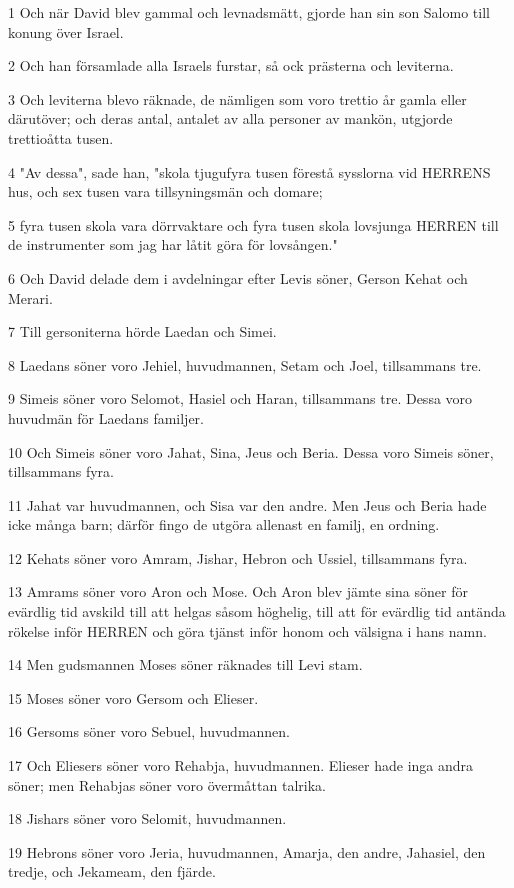\par 1 Och när David blev gammal och levnadsmätt, gjorde han sin son Salomo till konung över Israel.
\par 2 Och han församlade alla Israels furstar, så ock prästerna och leviterna.
\par 3 Och leviterna blevo räknade, de nämligen som voro trettio år gamla eller därutöver; och deras antal, antalet av alla personer av mankön, utgjorde trettioåtta tusen.
\par 4 "Av dessa", sade han, "skola tjugufyra tusen förestå sysslorna vid HERRENS hus, och sex tusen vara tillsyningsmän och domare;
\par 5 fyra tusen skola vara dörrvaktare och fyra tusen skola lovsjunga HERREN till de instrumenter som jag har låtit göra för lovsången."
\par 6 Och David delade dem i avdelningar efter Levis söner, Gerson Kehat och Merari.
\par 7 Till gersoniterna hörde Laedan och Simei.
\par 8 Laedans söner voro Jehiel, huvudmannen, Setam och Joel, tillsammans tre.
\par 9 Simeis söner voro Selomot, Hasiel och Haran, tillsammans tre. Dessa voro huvudmän för Laedans familjer.
\par 10 Och Simeis söner voro Jahat, Sina, Jeus och Beria. Dessa voro Simeis söner, tillsammans fyra.
\par 11 Jahat var huvudmannen, och Sisa var den andre. Men Jeus och Beria hade icke många barn; därför fingo de utgöra allenast en familj, en ordning.
\par 12 Kehats söner voro Amram, Jishar, Hebron och Ussiel, tillsammans fyra.
\par 13 Amrams söner voro Aron och Mose. Och Aron blev jämte sina söner för evärdlig tid avskild till att helgas såsom höghelig, till att för evärdlig tid antända rökelse inför HERREN och göra tjänst inför honom och välsigna i hans namn.
\par 14 Men gudsmannen Moses söner räknades till Levi stam.
\par 15 Moses söner voro Gersom och Elieser.
\par 16 Gersoms söner voro Sebuel, huvudmannen.
\par 17 Och Eliesers söner voro Rehabja, huvudmannen. Elieser hade inga andra söner; men Rehabjas söner voro övermåttan talrika.
\par 18 Jishars söner voro Selomit, huvudmannen.
\par 19 Hebrons söner voro Jeria, huvudmannen, Amarja, den andre, Jahasiel, den tredje, och Jekameam, den fjärde.
